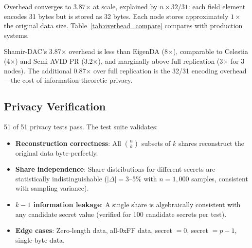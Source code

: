 Overhead converges to 3.87$\times$ at scale, explained by $n \times 32/31$:
each field element encodes 31 bytes but is stored as 32 bytes. Each node
stores approximately $1\times$ the original data size. Table~\ref{tab:overhead_compare}
compares with production systems.

\begin{table}[htbp]
\centering
\caption{Storage Overhead Comparison with Production Systems}
\label{tab:overhead_compare}
\end{table}

Shamir-DAC's 3.87$\times$ overhead is less than EigenDA (8$\times$),
comparable to Celestia (4$\times$) and Semi-AVID-PR (3.2$\times$), and
marginally above full replication (3$\times$ for 3 nodes). The additional
0.87$\times$ over full replication is the 32/31 encoding overhead---the
cost of information-theoretic privacy.

\subsection{Privacy Verification}

51 of 51 privacy tests pass. The test suite validates:

\begin{itemize}
\item \textbf{Reconstruction correctness}: All $\binom{n}{k}$ subsets of $k$
  shares reconstruct the original data byte-perfectly.
\item \textbf{Share independence}: Share distributions for different secrets
  are statistically indistinguishable ($|\Delta| = 3$--5\% with $n=1{,}000$
  samples, consistent with sampling variance).
\item \textbf{$k-1$ information leakage}: A single share is algebraically
  consistent with any candidate secret value (verified for 100 candidate
  secrets per test).
\item \textbf{Edge cases}: Zero-length data, all-0xFF data, secret $= 0$,
  secret $= p-1$, single-byte data.
\end{itemize}

